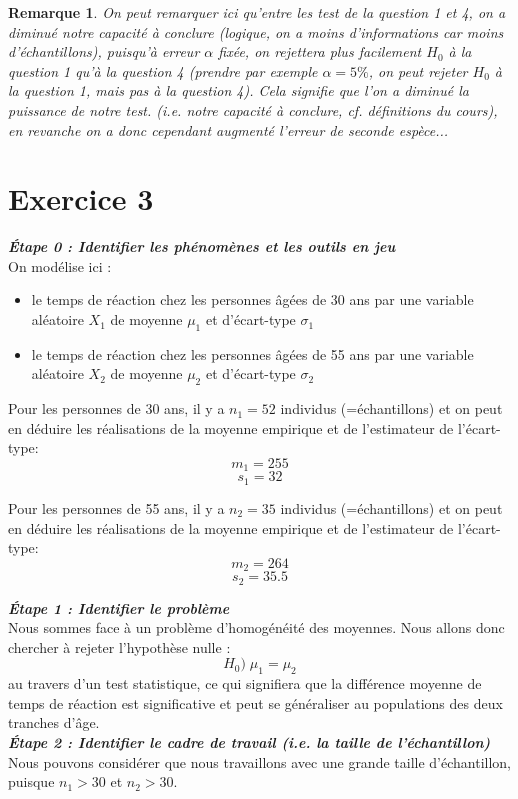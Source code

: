 \documentclass[a4paper,oneside,12pt]{article}
\theoremstyle{plain}
\newtheorem*{remark}{Remarque}
\begin{document}
\begin{remark}
On peut remarquer ici qu'entre les test de la question 1 et 4, on a diminué notre capacité à conclure (logique, on a moins d'informations car moins d'échantillons), puisqu'à erreur $\alpha$ fixée, on rejettera plus facilement $H_0$ à la question 1 qu'à la question 4 (prendre par exemple $\alpha = 5\%$, on peut rejeter $H_0$ à la question 1, mais pas à la question 4). Cela signifie que l'on a diminué la puissance de notre test. (i.e. notre capacité à conclure, cf. définitions du cours), en revanche on a donc cependant augmenté l'erreur de seconde espèce...
\end{remark}

\section*{Exercice 3}


\textit{\textbf{Étape 0 : Identifier les phénomènes et les outils en jeu}}\\
On modélise ici :
\begin{itemize}
    \item le temps de réaction chez les personnes âgées de 30 ans par une variable aléatoire $X_1$ de moyenne $\mu_1$ et d'écart-type $\sigma_1$
    \item le temps de réaction chez les personnes âgées de 55 ans par une variable aléatoire $X_2$ de moyenne $\mu_2$ et d'écart-type $\sigma_2$
\end{itemize}
    
Pour les personnes de 30 ans, il y a $n_1 = 52$ individus (=échantillons) et on peut en déduire les réalisations de la moyenne empirique et de l'estimateur de l'écart-type:
$$m_1 = 255$$
$$s_1 = 32$$
    
Pour les personnes de 55 ans, il y a $n_2 = 35$ individus (=échantillons) et on peut en déduire les réalisations de la moyenne empirique et de l'estimateur de l'écart-type:
$$m_2 = 264$$
$$s_2 = 35.5$$
    
\textit{\textbf{Étape 1 : Identifier le problème}}\\
Nous sommes face à un problème d'homogénéité des moyennes. Nous allons donc chercher à rejeter l'hypothèse nulle :
$$H_0) \;\mu_1=\mu_2$$ 
au travers d'un test statistique, ce qui signifiera que la différence moyenne de temps de réaction est significative et peut se généraliser au populations des deux tranches d'âge.\\
    
\textit{\textbf{Étape 2 : Identifier le cadre de travail (i.e. la taille de l'échantillon)}}\\
Nous pouvons considérer que nous travaillons avec une grande taille d'échantillon, puisque $n_1>30$ et $n_2>30$.\\
\vspace{1cm}
\end{document}
